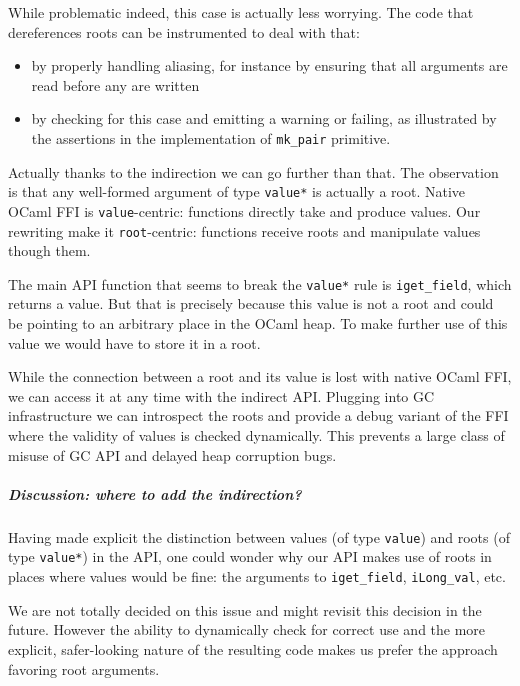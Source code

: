 \documentclass[a4paper]{easychair}
\begin{document}
While problematic indeed, this case is actually less worrying. The code
that dereferences roots can be instrumented to deal with that:

\begin{itemize}
\tightlist
\item
  by properly handling aliasing, for instance by ensuring that all
  arguments are read before any are written
\item
  by checking for this case and emitting a warning or failing, as
  illustrated by the assertions in the implementation of
  \texttt{mk\_pair} primitive. 
\end{itemize}

Actually thanks to the indirection we can go further than that. The
observation is that any well-formed argument of type \texttt{value*} is
actually a root. Native OCaml FFI is \texttt{value}-centric: functions
directly take and produce values. Our rewriting make it
\texttt{root}-centric: functions receive roots and manipulate values
though them.

The main API function that seems to break the \texttt{value*} rule is
\texttt{iget\_field}, which returns a value. But that is precisely
because this value is not a root and could be pointing to an arbitrary
place in the OCaml heap. To make further use of this value we would have
to store it in a root.

While the connection between a root and its value is lost with native
OCaml FFI, we can access it at any time with the indirect API. Plugging
into GC infrastructure we can introspect the roots and provide a debug
variant of the FFI where the validity of values is checked dynamically.
This prevents a large class of misuse of GC API and delayed heap
corruption bugs.

\hypertarget{discussion-where-to-add-the-indirection}{%
\subparagraph{Discussion: where to add the
indirection?}\label{discussion-where-to-add-the-indirection}}

Having made explicit the distinction between values (of type
\texttt{value}) and roots (of type \texttt{value*}) in the API, one
could wonder why our API makes use of roots in places where values would
be fine: the arguments to \texttt{iget\_field}, \texttt{iLong\_val},
etc.

We are not totally decided on this issue and might revisit this decision
in the future. However the ability to dynamically check for correct use
and the more explicit, safer-looking nature of the resulting code makes
us prefer the approach favoring root arguments.
\end{document}
